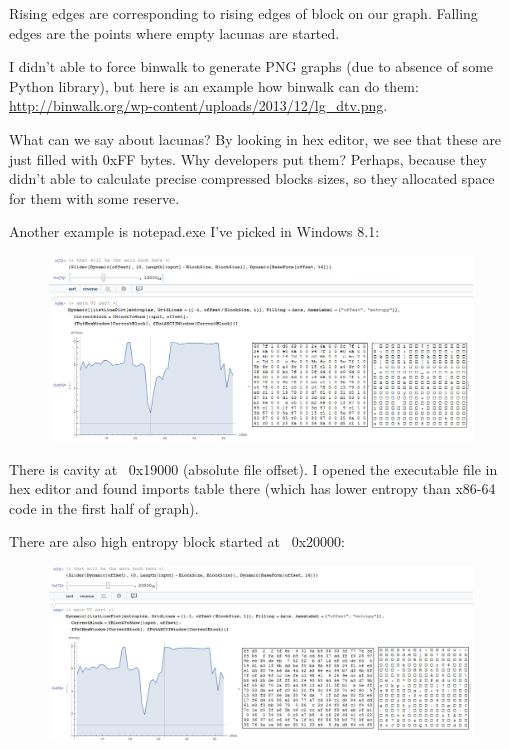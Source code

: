 Rising edges are corresponding to rising edges of block on our graph.
Falling edges are the points where empty lacunas are started.

I didn't able to force binwalk to generate PNG graphs (due to absence of some Python library), but here is an example how binwalk
can do them: \url{http://binwalk.org/wp-content/uploads/2013/12/lg_dtv.png}.

What can we say about lacunas? By looking in hex editor, we see that these are just filled with 0xFF bytes.
Why developers put them? Perhaps, because they didn't able to calculate precise compressed blocks sizes, so they allocated space
for them with some reserve.



Another example is notepad.exe I've picked in Windows 8.1:

\begin{figure}[H]
\centering
\includegraphics[scale=\FigScale]{ff/entropy/notepad1.png}
\end{figure}

There is cavity at ~0x19000 (absolute file offset).
I opened the executable file in hex editor and found imports table there (which has lower entropy than x86-64 code
in the first half of graph).

There are also high entropy block started at ~0x20000:

\begin{figure}[H]
\centering
\includegraphics[scale=\FigScale]{ff/entropy/notepad2.png}
\end{figure}

